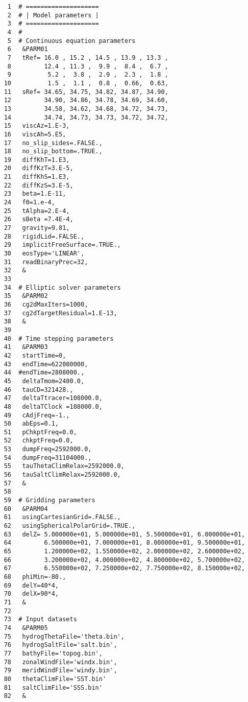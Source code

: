 
\begin{verbatim}
     1	# ====================
     2	# | Model parameters |
     3	# ====================
     4	#
     5	# Continuous equation parameters
     6	 &PARM01
     7	 tRef= 16.0 , 15.2 , 14.5 , 13.9 , 13.3 ,
     8	       12.4 , 11.3 ,  9.9 ,  8.4 ,  6.7 ,
     9	        5.2 ,  3.8 ,  2.9 ,  2.3 ,  1.8 ,
    10	        1.5 ,  1.1 ,  0.8 ,  0.66,  0.63,
    11	 sRef= 34.65, 34.75, 34.82, 34.87, 34.90,
    12	       34.90, 34.86, 34.78, 34.69, 34.60,
    13	       34.58, 34.62, 34.68, 34.72, 34.73,
    14	       34.74, 34.73, 34.73, 34.72, 34.72,
    15	 viscAz=1.E-3,
    16	 viscAh=5.E5,
    17	 no_slip_sides=.FALSE.,
    18	 no_slip_bottom=.TRUE.,
    19	 diffKhT=1.E3,
    20	 diffKzT=3.E-5,
    21	 diffKhS=1.E3,
    22	 diffKzS=3.E-5,
    23	 beta=1.E-11,
    24	 f0=1.e-4,
    25	 tAlpha=2.E-4,
    26	 sBeta =7.4E-4,
    27	 gravity=9.81,
    28	 rigidLid=.FALSE.,
    29	 implicitFreeSurface=.TRUE.,
    30	 eosType='LINEAR',
    31	 readBinaryPrec=32,
    32	 &
    33	
    34	# Elliptic solver parameters
    35	 &PARM02
    36	 cg2dMaxIters=1000,
    37	 cg2dTargetResidual=1.E-13,
    38	 &
    39	
    40	# Time stepping parameters
    41	 &PARM03
    42	 startTime=0,
    43	 endTime=622080000,
    44	#endTime=2808000.,
    45	 deltaTmom=2400.0,
    46	 tauCD=321428.,
    47	 deltaTtracer=108000.0,
    48	 deltaTClock =108000.0,
    49	 cAdjFreq=-1.,
    50	 abEps=0.1,
    51	 pChkptFreq=0.0,
    52	 chkptFreq=0.0,
    53	 dumpFreq=2592000.0,
    54	 dumpFreq=31104000.,
    55	 tauThetaClimRelax=2592000.0,
    56	 tauSaltClimRelax=2592000.0,
    57	 &
    58	
    59	# Gridding parameters
    60	 &PARM04
    61	 usingCartesianGrid=.FALSE.,
    62	 usingSphericalPolarGrid=.TRUE.,
    63	 delZ= 5.000000e+01, 5.000000e+01, 5.500000e+01, 6.000000e+01,
    64	       6.500000e+01, 7.000000e+01, 8.000000e+01, 9.500000e+01,
    65	       1.200000e+02, 1.550000e+02, 2.000000e+02, 2.600000e+02,
    66	       3.200000e+02, 4.000000e+02, 4.800000e+02, 5.700000e+02,
    67	       6.550000e+02, 7.250000e+02, 7.750000e+02, 8.150000e+02,
    68	 phiMin=-80.,
    69	 delY=40*4,
    70	 delX=90*4,
    71	 &
    72	
    73	# Input datasets
    74	 &PARM05
    75	 hydrogThetaFile='theta.bin',
    76	 hydrogSaltFile='salt.bin',
    77	 bathyFile='topog.bin',
    78	 zonalWindFile='windx.bin',
    79	 meridWindFile='windy.bin',
    80	 thetaClimFile='SST.bin'
    81	 saltClimFile='SSS.bin'
    82	 &
\end{verbatim}
